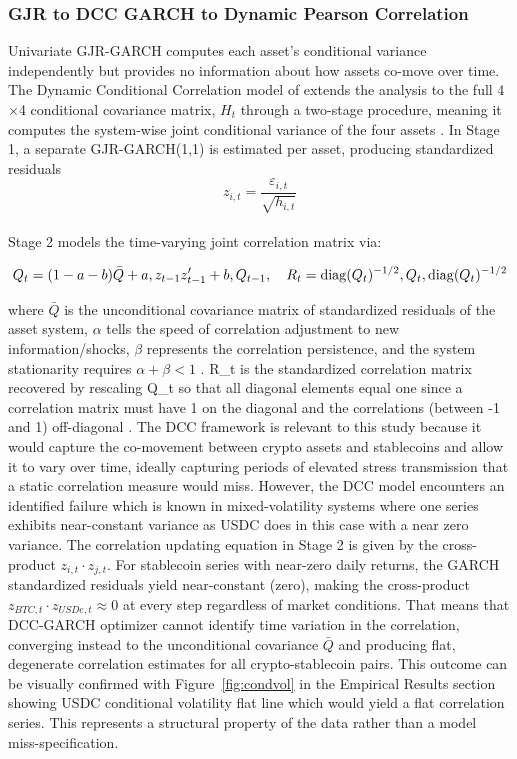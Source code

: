 \documentclass[12pt,a4paper,titlepage,oneside,english]{article}
\begin{document}
\subsubsection{GJR to DCC GARCH to Dynamic Pearson Correlation}
Univariate GJR-GARCH computes each asset's conditional variance independently but provides no information about how assets co-move over time. The Dynamic Conditional Correlation model of \parencite{Engle01072002} extends the analysis to the full 4$\times$4 conditional covariance matrix, $H_t$ through a two-stage procedure, meaning it computes the system-wise joint conditional variance of the four assets \parencite{HUAI2026102526}. In Stage 1, a separate GJR-GARCH(1,1) is estimated per asset, producing standardized residuals $$z_{i,t} = \frac{\varepsilon_{i,t}}{\sqrt{h_{i,t}}}$$ \\
Stage 2 models the time-varying joint correlation matrix via:

\begin{equation}
Q_t = (1 - a - b)\bar{Q} + a , z_{t-1} z_{t-1}^{\prime} + b , Q_{t-1},\\ 
\quad R_t = \mathrm{diag}(Q_t)^{-1/2} , Q_t , \mathrm{diag}(Q_t)^{-1/2}
\end{equation}

where $\bar{Q}$ is the unconditional covariance matrix of standardized residuals of the asset system, $\alpha$ tells the speed of correlation adjustment to new information/shocks, $\beta$ represents the correlation persistence, and the system stationarity requires $\alpha + \beta < 1$ \parencite{HUAI2026102526}. R\_t is the standardized correlation matrix recovered by rescaling Q\_t so that all diagonal elements equal one since a correlation matrix must have 1 on the diagonal and the correlations (between -1 and 1) off-diagonal \parencite{Engle01072002}. The DCC framework is relevant to this study because it would capture the co-movement between crypto assets and stablecoins and allow it to vary over time, ideally capturing periods of elevated stress transmission that a static correlation measure would miss.
However, the DCC model encounters an identified failure which is known in mixed-volatility systems where one series exhibits near-constant variance \parencite{Engle01072002} as USDC does in this case with a near zero variance. The correlation updating equation in Stage 2 is given by the cross-product $z_{i,t} \cdot z_{j,t}$. For stablecoin series with near-zero daily returns, the GARCH standardized residuals yield near-constant (zero), making the cross-product $z_{BTC,t} \cdot z_{USDe,t} \approx 0$ at every step regardless of market conditions. That means that DCC-GARCH optimizer cannot identify time variation in the correlation, converging instead to the unconditional covariance $\bar{Q}$ and producing flat, degenerate correlation estimates for all crypto-stablecoin pairs. 
This outcome can be visually confirmed with Figure~\ref{fig:condvol} in the Empirical Results section showing USDC conditional volatility flat line which would yield a flat correlation series. This represents a structural property of the data rather than a model miss-specification. \\
\end{document}
